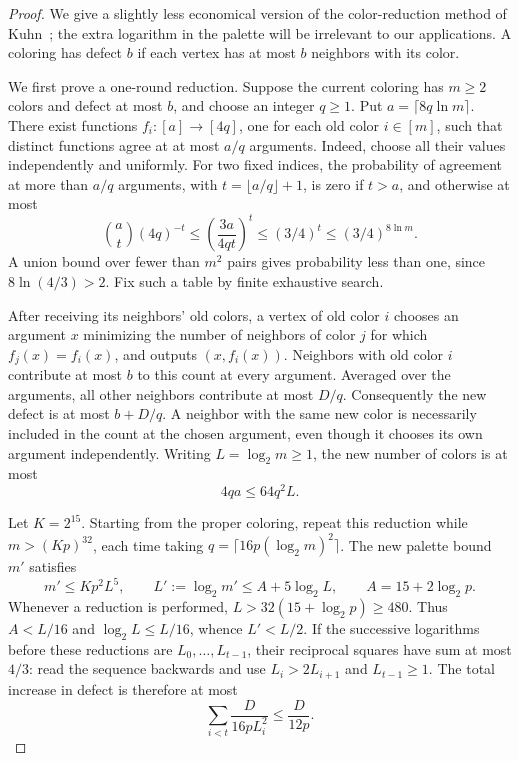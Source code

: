 \documentclass[11pt]{article}
\theoremstyle{definition}
\theoremstyle{remark}
\begin{document}
\begin{proof}
We give a slightly less economical version of the color-reduction method
of Kuhn~\cite[Section~4]{Kuhn}; the extra logarithm in the palette will be
irrelevant to our applications.  A coloring has defect $b$ if each vertex
has at most $b$ neighbors with its color.

We first prove a one-round reduction.  Suppose the current coloring has
$m\ge2$ colors and defect at most $b$, and choose an integer $q\ge1$.
Put $a=\lceil8q\ln m\rceil$.  There exist functions
$f_i:[a]\to[4q]$, one for each old color $i\in[m]$, such that distinct
functions agree at at most $a/q$ arguments.  Indeed, choose all their
values independently and uniformly.  For two fixed indices, the
probability of agreement at more than $a/q$ arguments, with
$t=\lfloor a/q\rfloor+1$, is zero if $t>a$, and otherwise at most
\[
 \binom at(4q)^{-t}
 \le \left(\frac{3a}{4qt}\right)^t
 \le (3/4)^t
 \le (3/4)^{8\ln m}.
\]
A union bound over fewer than $m^2$ pairs gives probability less than one,
since $8\ln(4/3)>2$.  Fix such a table by finite exhaustive search.

After receiving its neighbors' old colors, a vertex of old color $i$
chooses an argument $x$ minimizing the number of neighbors of color $j$
for which $f_j(x)=f_i(x)$, and outputs $(x,f_i(x))$.
Neighbors with old color $i$ contribute at most $b$ to this count at
every argument.  Averaged over the arguments, all other neighbors
contribute at most $D/q$.  Consequently the new defect is at most
$b+D/q$.  A neighbor with the same new color is necessarily included
in the count at the chosen argument, even though it chooses its own
argument independently.  Writing $L=\log_2 m\ge1$, the new number of
colors is at most
\begin{equation}\label{eq:defective-one-step}
 4qa\le64q^2L.
\end{equation}

Let $K=2^{15}$.  Starting from the proper coloring, repeat this reduction
while $m>(Kp)^{32}$, each time taking
$q=\lceil16p(\log_2m)^2\rceil$.  The new palette bound $m'$ satisfies
\[
 m'\le Kp^2L^5,\qquad
 L':=\log_2m'\le A+5\log_2L,
 \qquad A=15+2\log_2p.
\]
Whenever a reduction is performed, $L>32(15+\log_2p)\ge480$.
Thus $A<L/16$ and $\log_2L\le L/16$, whence $L'<L/2$.
If the successive logarithms before these reductions are
$L_0,\ldots,L_{t-1}$, their reciprocal squares have sum at most $4/3$:
read the sequence backwards and use $L_i>2L_{i+1}$ and
$L_{t-1}\ge1$.  The total increase in defect is therefore at most
\[
 \sum_{i<t}\frac{D}{16pL_i^2}\le\frac{D}{12p}.
\]


\end{proof}
\end{document}

